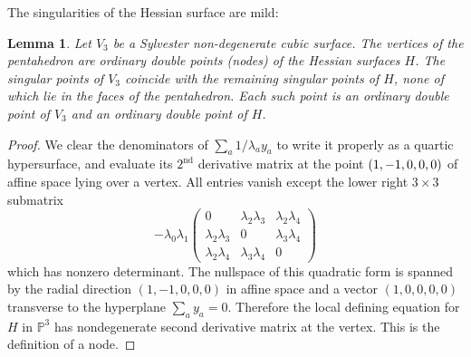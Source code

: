 \documentclass[11pt]{article}
\newtheorem{lemm}[theo]{Lemma}
\theoremstyle{definition}
\numberwithin{equation}{section}
\numberwithin{figure}{section}
\numberwithin{table}{section}
\newcommand{\bbP}{{\mathbb{P}}}
\begin{document}
The singularities of the Hessian surface are mild:

\begin{lemm}\label{newsing}
Let $V_3$ be a Sylvester non-degenerate cubic surface. The vertices of the pentahedron are ordinary double points (nodes) of the Hessian surfaces $H$. The singular points of $V_3$ coincide with the remaining singular points of $H$, none of which lie in the faces of the pentahedron. Each such point is an ordinary double point of $V_3$ and an ordinary double point of $H$.
\end{lemm}

\pagebreak
\begin{proof}
We clear the denominators of $\sum_a1/\lambda_ay_a$ to write it properly as a quartic hypersurface, and evaluate its $2^{\text{nd}}$ derivative matrix at the point $(1,-1,\discretionary{}{}{}0,\discretionary{}{}{}0,0)$ of affine space lying over a vertex. All entries vanish except the lower right $3\times3$ submatrix
\begin{equation*}
-\lambda_0\lambda_1
\begin{pmatrix}
0&\lambda_2\lambda_3&\lambda_2\lambda_4
\\
\lambda_2\lambda_3&0&\lambda_3\lambda_4
\\
\lambda_2\lambda_4&\lambda_3\lambda_4&0
\end{pmatrix}
\end{equation*}
which has nonzero determinant. The nullspace of this quadratic form is spanned by the radial direction $(1,-1,0,0,0)$ in affine space and a vector $(1,0,0,0,0)$ transverse to the hyperplane $\sum_ay_a=0$. Therefore the local defining equation for $H$ in $\bbP^3$ has nondegenerate second derivative matrix at the vertex. This is the definition of a node.



\end{proof}
\end{document}
